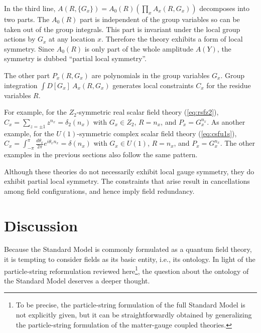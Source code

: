 \documentclass[12pt]{article}
\theoremstyle{definition}
\begin{document}
In the third line, $A(R,\{G_x\}) = A_0(R) (\prod_x A_x(R,G_x))$ decomposes into two parts. The $A_0(R)$ part is independent of the group variables so can be taken out of the group integrals. This part is invariant under the local group actions by $G_x$ at any location $x$. Therefore the theory exhibits a form of local symmetry. Since $A_0(R)$ is only part of the whole amplitude $A(Y)$, the symmetry is dubbed ``partial local symmetry''.

The other part $P_x(R,G_x)$ are polynomials in the group variables $G_x$. Group integration $\int D[G_x]~ A_x(R,G_x)$ generates local constraints $C_x$ for the residue variables $R$.

For example, for the $Z_2$-symmetric real scalar field theory (\ref{eq:rsfz2}), $C_x = \sum_{z=\pm 1} z^{n_x}=\delta_2(n_x)$ with $G_x\in Z_2$, $R=n_x$, and $P_x=G_x^{n_x}$. As another example, for the $U(1)$-symmetric complex scalar field theory (\ref{eq:csfu1s}), $C_x = \int_{-\pi}^{\pi} \frac{d\theta_x}{2\pi} e^{i \theta_x n_x}=\delta(n_x)$ with $G_x\in U(1)$, $R=n_x$, and $P_x=G_x^{n_x}$. The other examples in the previous sections also follow the same pattern. 

Although these theories do not necessarily exhibit local gauge symmetry, they do exhibit partial local symmetry. The constraints that arise result in cancellations among field configurations, and hence imply field redundancy.



\section{Discussion}\label{sec:d}

Because the Standard Model is commonly formulated as a quantum field theory, it is tempting to consider fields as its basic entity, i.e., its ontology. In light of the particle-string reformulation reviewed here\footnote{To be precise, the particle-string formulation of the  full Standard Model is not explicitly given, but it can be straightforwardly obtained by generalizing the particle-string formulation of the matter-gauge coupled theories.}, the question about the ontology of the Standard Model deserves a deeper thought.
\end{document}
